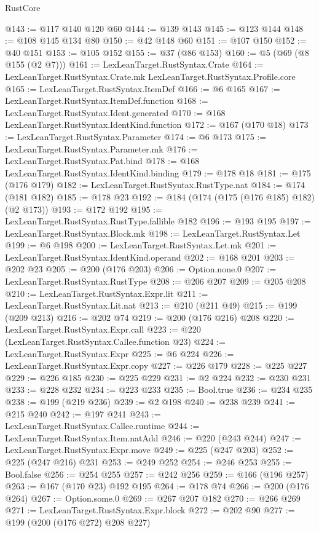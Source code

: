 \begin{lexlean}{RustCore}
\begin{coremodule}
@143 := @117 @140 @120 @60
@144 := @139 @143
@145 := @123 @144
@148 := @108 @145 @134 @80
@150 := @42 @148 @60
@151 := @107 @150
@152 := @40 @151
@153 := @105 @152
@155 := @37 (@86 @153)
@160 := @5 (@69 (@8 @155 (@2 @7)))
@161 := LexLeanTarget.RustSyntax.Crate
@164 := LexLeanTarget.RustSyntax.Crate.mk LexLeanTarget.RustSyntax.Profile.core
@165 := LexLeanTarget.RustSyntax.ItemDef
@166 := @6 @165
@167 := LexLeanTarget.RustSyntax.ItemDef.function
@168 := LexLeanTarget.RustSyntax.Ident.generated
@170 := @168 LexLeanTarget.RustSyntax.IdentKind.function
@172 := @167 (@170 @18)
@173 := LexLeanTarget.RustSyntax.Parameter
@174 := @6 @173
@175 := LexLeanTarget.RustSyntax.Parameter.mk
@176 := LexLeanTarget.RustSyntax.Pat.bind
@178 := @168 LexLeanTarget.RustSyntax.IdentKind.binding
@179 := @178 @18
@181 := @175 (@176 @179)
@182 := LexLeanTarget.RustSyntax.RustType.nat
@184 := @174 (@181 @182)
@185 := @178 @23
@192 := @184 (@174 (@175 (@176 @185) @182) (@2 @173))
@193 := @172 @192
@195 := LexLeanTarget.RustSyntax.RustType.fallible @182
@196 := @193 @195
@197 := LexLeanTarget.RustSyntax.Block.mk
@198 := LexLeanTarget.RustSyntax.Let
@199 := @6 @198
@200 := LexLeanTarget.RustSyntax.Let.mk
@201 := LexLeanTarget.RustSyntax.IdentKind.operand
@202 := @168 @201
@203 := @202 @23
@205 := @200 (@176 @203)
@206 := Option.none.{0}
@207 := LexLeanTarget.RustSyntax.RustType
@208 := @206 @207
@209 := @205 @208
@210 := LexLeanTarget.RustSyntax.Expr.lit
@211 := LexLeanTarget.RustSyntax.Lit.nat
@213 := @210 (@211 @49)
@215 := @199 (@209 @213)
@216 := @202 @74
@219 := @200 (@176 @216) @208
@220 := LexLeanTarget.RustSyntax.Expr.call
@223 := @220 (LexLeanTarget.RustSyntax.Callee.function @23)
@224 := LexLeanTarget.RustSyntax.Expr
@225 := @6 @224
@226 := LexLeanTarget.RustSyntax.Expr.copy
@227 := @226 @179
@228 := @225 @227
@229 := @226 @185
@230 := @225 @229
@231 := @2 @224
@232 := @230 @231
@233 := @228 @232
@234 := @223 @233
@235 := Bool.true
@236 := @234 @235
@238 := @199 (@219 @236)
@239 := @2 @198
@240 := @238 @239
@241 := @215 @240
@242 := @197 @241
@243 := LexLeanTarget.RustSyntax.Callee.runtime
@244 := LexLeanTarget.RustSyntax.Item.natAdd
@246 := @220 (@243 @244)
@247 := LexLeanTarget.RustSyntax.Expr.move
@249 := @225 (@247 @203)
@252 := @225 (@247 @216) @231
@253 := @249 @252
@254 := @246 @253
@255 := Bool.false
@256 := @254 @255
@257 := @242 @256
@259 := @166 (@196 @257)
@263 := @167 (@170 @23) @192 @195
@264 := @178 @74
@266 := @200 (@176 @264)
@267 := Option.some.{0}
@269 := @267 @207 @182
@270 := @266 @269
@271 := LexLeanTarget.RustSyntax.Expr.block
@272 := @202 @90
@277 := @199 (@200 (@176 @272) @208 @227)

\end{coremodule}
\end{lexlean}
